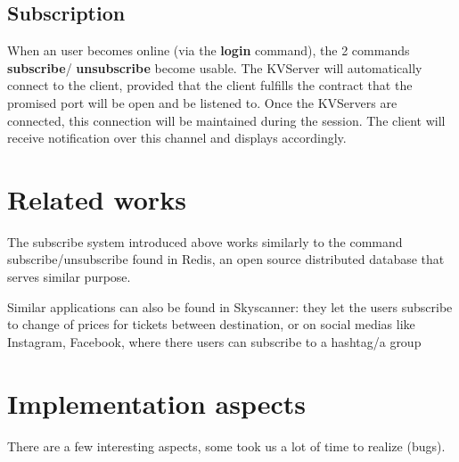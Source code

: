 \documentclass[sigconf]{acmart}
\begin{document}
\subsection{Subscription}

When an user becomes online (via the \textbf{login} command), the 2 commands \textbf{subscribe}/ \textbf{unsubscribe} become usable. The KVServer will automatically connect to the client, provided that the client fulfills the contract that the promised port will be open and be listened to. Once the KVServers are connected, this connection will be maintained during the session. The client will receive notification over this channel and displays accordingly.

\section{Related works}

The subscribe system introduced above works similarly to the command subscribe/unsubscribe found in Redis, an open source distributed database that serves similar purpose. \cite{redis}

Similar applications can also be found in Skyscanner: they let the users subscribe to change of prices for tickets between destination, or on social medias like Instagram, Facebook, where there users can subscribe to a hashtag/a group

\section{Implementation aspects}

There are a few interesting aspects, some took us a lot of time to realize (bugs).
\end{document}
